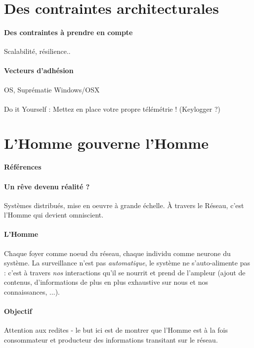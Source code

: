 \section{Des contraintes architecturales}
\paragraph{Des contraintes à prendre en compte} Scalabilité, résilience..
\paragraph{Vecteurs d'adhésion} OS, Suprématie Windows/OSX

\paragraph{} Do it Yourself : Mettez en place votre propre télémétrie ! (Keylogger ?)


\section{L'Homme gouverne l'Homme}
\paragraph{Références} \cite{GhostInTheShell}

\paragraph{Un rêve devenu réalité ?} Systèmes distribués, mise en oeuvre à grande échelle.
À travers le Réseau, c'est l'Homme qui devient omniscient.

\paragraph{L'Homme} Chaque foyer comme noeud du réseau, chaque individu comme neurone du
système. La surveillance n'est pas \emph{automatique}, le système ne s'auto-alimente pas :
c'est à travers \emph{nos} interactions qu'il se nourrit et prend de l'ampleur (ajout de 
contenus, d'informations de plus en plus exhaustive sur nous et nos connaissances, ...).

\paragraph{Objectif} Attention aux redites - le but ici est de montrer que l'Homme est à la fois
consommateur et producteur des informations transitant sur le réseau.